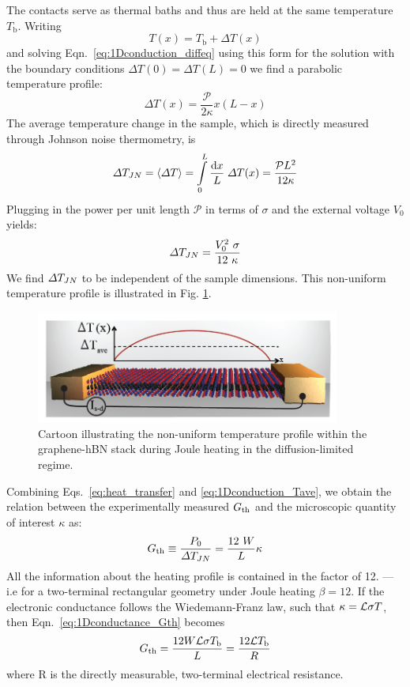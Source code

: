 The contacts serve as thermal baths and thus are held at the same temperature $T_\mathrm{b}$. Writing 
\begin{equation}
T(x) = T_\mathrm{b} + \Delta T(x)
\end{equation}
and solving Eqn.~\ref{eq:1Dconduction_diffeq} using this form for the solution with the boundary conditions $\Delta T(0) = \Delta T(L) = 0$ we find a parabolic temperature profile:
\begin{equation}
\Delta T(x) = \frac{\mathcal{P}}{2\kappa}x(L-x) 
\end{equation}
The average temperature change in the sample, which is directly measured through Johnson noise thermometry, is 
\begin{equation}\label{eq:1Dconduction_Tave}
\Delta T_{JN} = \langle\Delta T\rangle = \int\limits_0^L \frac{\mathrm{d}x}{L}\; \Delta T(x)  = \frac{\mathcal{P}L^2}{12\kappa}
\end{equation}
Plugging in the power per unit length $\mathcal{P}$ in terms of $\sigma$ and the external voltage $V_0$ yields:
\begin{equation}
\Delta T_{JN} = \frac{V_0^2~\sigma}{12~\kappa}
\end{equation}
We find $\Delta T_{JN}$ to be independent of the sample dimensions. This non-uniform temperature profile is illustrated in Fig. \ref{fig:cartoon_Tprofile}.   
\begin{figure}
\centering
\includegraphics[width=100mm]{figures/thermal_via_noise/picture_temperature_profile.png}
\caption{Cartoon illustrating the non-uniform temperature profile within the graphene-hBN stack during Joule heating in the diffusion-limited regime.}
\label{fig:cartoon_Tprofile}
\end{figure}

Combining Eqs.~\ref{eq:heat_transfer} and \ref{eq:1Dconduction_Tave}, we obtain the relation between the experimentally measured $G_{\mathrm{th}}$ and the microscopic quantity of interest $\kappa$ as:
\begin{equation}\label{eq:1Dconductance_Gth}
G_{\mathrm{th}} \equiv \frac{P_0}{\Delta T_{JN}} = \frac{12~W}{L} \kappa
\end{equation}
All the information about the heating profile is contained in the factor of 12. --- i.e for a two-terminal rectangular geometry under Joule heating ${\beta=12}$. If the electronic conductance follows the Wiedemann-Franz law, such that $\kappa=\mathcal{L}\sigma T$, then Eqn.~\ref{eq:1Dconductance_Gth} becomes
\begin{equation}\label{eq:1Dconductance_GthWF}
G_{\mathrm{th}} = \frac{12W\mathcal{L}\sigma T_\mathrm{b}}{L} = \frac{12\mathcal{L} T_\mathrm{b}}{R}
\end{equation}
where R is the directly measurable, two-terminal electrical resistance.

